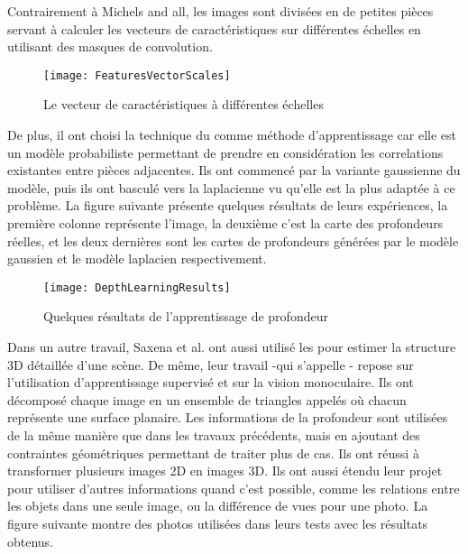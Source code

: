 Contrairement à Michels and all, les images sont divisées en de petites
pièces servant à calculer les vecteurs de caractéristiques sur différentes
échelles en utilisant des masques de convolution.

\begin{figure}[H]
\begin{center}
\texttt{[image: FeaturesVectorScales]}
\caption{Le vecteur de caractéristiques à  différentes échelles}{}
\end{center}
\end{figure}

De plus, il ont choisi la technique du  comme
méthode d'apprentissage car elle est un modèle probabiliste permettant de
prendre en considération les correlations existantes entre pièces adjacentes.
Ils ont commencé par la variante gaussienne du modèle, puis ils ont
basculé vers la laplacienne vu qu'elle est la plus adaptée à ce problème.
La figure suivante présente quelques résultats de leurs expériences, la première
colonne représente l'image, la deuxième c'est la carte des profondeurs réelles, et
les deux dernières sont les cartes de profondeurs générées par le modèle gaussien
et le modèle laplacien respectivement.

\begin{figure}[H]
\begin{center}
\texttt{[image: DepthLearningResults]}
\caption{Quelques résultats de l'apprentissage de profondeur}{}
\end{center}
\end{figure}

Dans un autre travail, Saxena et al.\cite{saxena2009make3d} ont aussi utilisé les
pour estimer la structure 3D détaillée d'une scène. De même, leur travail -qui
s'appelle - repose sur l'utilisation d'apprentissage supervisé et
sur la vision monoculaire. Ils ont décomposé chaque image en un ensemble de
triangles appelés  où chacun représente une surface planaire.
Les informations de la profondeur sont utilisées de la même manière que dans les
travaux précédents, mais en ajoutant des contraintes géométriques permettant de
traiter plus de cas. Ils ont réussi à transformer plusieurs images 2D en
images 3D. Ils ont aussi étendu leur projet pour utiliser d'autres informations
quand c'est possible, comme les relations entre les objets dans une seule image, ou
la différence de vues pour une photo. La figure suivante montre des photos
utilisées dans leurs tests avec les résultats obtenus.

